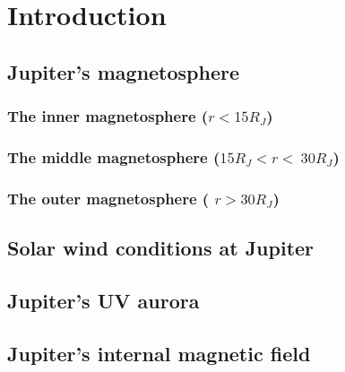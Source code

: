 \chapter{Introduction}

\section{Jupiter's magnetosphere}
\subsection{The inner magnetosphere (\texorpdfstring{$r < 15 R_J$)}{r<15}}
\subsection{The middle magnetosphere (\texorpdfstring{$15 R_J < r < ~30 R_J$)}{15<r<30}}
\subsection{The outer magnetosphere ( \texorpdfstring{$r > 30 R_J$)}{r>30}}

\section{Solar wind conditions at Jupiter}
\section{Jupiter's UV aurora}
\section{Jupiter's internal magnetic field}



